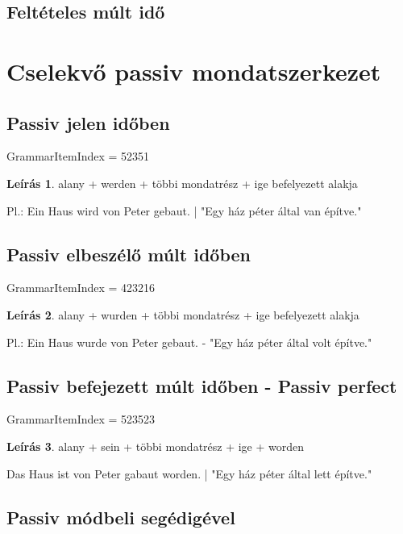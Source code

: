 \documentclass{article}
\theoremstyle{definition}
\newtheorem*{desc}{Leírás}
\begin{document}
\subsection{Feltételes múlt idő}

\section{Cselekvő passiv mondatszerkezet}

\subsection{Passiv jelen időben}

GrammarItemIndex = 52351

\begin{desc}
alany + werden + többi mondatrész + ige befelyezett alakja

Pl.: Ein Haus wird von Peter gebaut. | "Egy ház péter által van építve." 
\end{desc}

\subsection{Passiv elbeszélő múlt időben}

GrammarItemIndex = 423216

\begin{desc}
alany + wurden + többi mondatrész + ige befelyezett alakja

Pl.: Ein Haus wurde von Peter gebaut. - "Egy ház péter által volt építve."
\end{desc}

\subsection{Passiv befejezett múlt időben - Passiv perfect}

GrammarItemIndex = 523523

\begin{desc}
alany + sein + többi mondatrész + ige + worden

Das Haus ist von Peter gabaut worden. | "Egy ház péter által lett építve."
\end{desc}

\subsection{Passiv módbeli segédigével}
\end{document}
